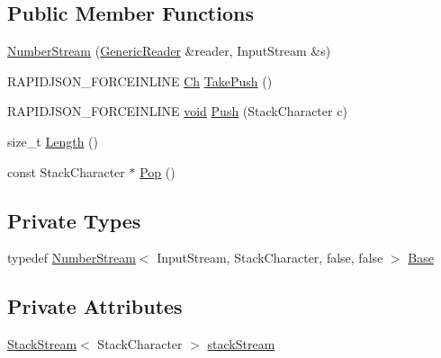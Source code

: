 \subsection*{Public Member Functions}
\begin{DoxyCompactItemize}
\item 
\hyperlink{classGenericReader_1_1NumberStream_3_01InputStream_00_01StackCharacter_00_01true_00_01false_01_4_a45f64e169c5448925013161c169f375f}{Number\+Stream} (\hyperlink{classGenericReader}{Generic\+Reader} \&reader, Input\+Stream \&s)
\item 
R\+A\+P\+I\+D\+J\+S\+O\+N\+\_\+\+F\+O\+R\+C\+E\+I\+N\+L\+I\+NE \hyperlink{classGenericReader_1_1NumberStream_3_01InputStream_00_01StackCharacter_00_01false_00_01false_01_4_a2971d286306cf8df899b87ea9dd24f27}{Ch} \hyperlink{classGenericReader_1_1NumberStream_3_01InputStream_00_01StackCharacter_00_01true_00_01false_01_4_a4d7c647825c4346e88638f27ead739ef}{Take\+Push} ()
\item 
R\+A\+P\+I\+D\+J\+S\+O\+N\+\_\+\+F\+O\+R\+C\+E\+I\+N\+L\+I\+NE \hyperlink{imgui__impl__opengl3__loader_8h_ac668e7cffd9e2e9cfee428b9b2f34fa7}{void} \hyperlink{classGenericReader_1_1NumberStream_3_01InputStream_00_01StackCharacter_00_01true_00_01false_01_4_a103447df5bb480245e1495fb5041989e}{Push} (Stack\+Character c)
\item 
size\+\_\+t \hyperlink{classGenericReader_1_1NumberStream_3_01InputStream_00_01StackCharacter_00_01true_00_01false_01_4_a881b01ff74eda61822c999522610a7bd}{Length} ()
\item 
const Stack\+Character $\ast$ \hyperlink{classGenericReader_1_1NumberStream_3_01InputStream_00_01StackCharacter_00_01true_00_01false_01_4_ad29417c240a6e404ba15d5f1c2228d31}{Pop} ()
\end{DoxyCompactItemize}
\subsection*{Private Types}
\begin{DoxyCompactItemize}
\item 
typedef \hyperlink{classGenericReader_1_1NumberStream}{Number\+Stream}$<$ Input\+Stream, Stack\+Character, false, false $>$ \hyperlink{classGenericReader_1_1NumberStream_3_01InputStream_00_01StackCharacter_00_01true_00_01false_01_4_a59fe7f9d3da6145a8ff45c6a9dad5de4}{Base}
\end{DoxyCompactItemize}
\subsection*{Private Attributes}
\begin{DoxyCompactItemize}
\item 
\hyperlink{classGenericReader_1_1StackStream}{Stack\+Stream}$<$ Stack\+Character $>$ \hyperlink{classGenericReader_1_1NumberStream_3_01InputStream_00_01StackCharacter_00_01true_00_01false_01_4_a144461a74c5f310297a8387df9d04d9f}{stack\+Stream}
\end{DoxyCompactItemize}

